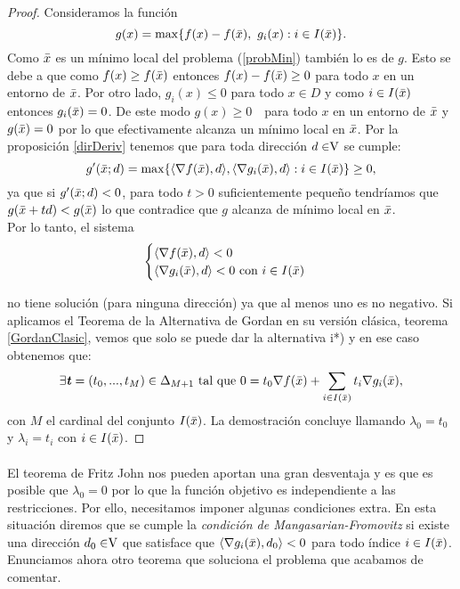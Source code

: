 		\begin{proof}
			Consideramos la función 
			\[
			g(x) = \max \{ f(x) - f(\bar{x}),\text{ } g_i(x) : i \in I(\bar{x})\}.
			\]
			Como $ \bar{x} $ es un mínimo local del problema (\ref{probMin}) también lo es de $ g $. Esto se debe a que como $ f(x) \geq f(\bar{x}) $ entonces $ f(x) - f(\bar{x}) \geq 0$ para todo $ x $ en un entorno de $ \bar{x} $. Por otro lado, $ g_i(x) \leq 0 $ para todo $ x \in D $ y como $ i \in I(\bar{x}) $ entonces $ g_i(\bar{x})=0 $. De este modo $ g(x) \geq 0 \text{ } $ para todo $ x $ en un entorno de $ \bar{x} $ y $ g(\bar{x}) = 0 $ por lo que efectivamente alcanza un mínimo local en $ \bar{x} $. Por la proposición \ref{dirDeriv} tenemos que para toda dirección $ d \in \vecSpace $ se cumple:
			\[
			g'(\bar{x};d) = \max \{ \langle \nabla f(\bar{x}), d\rangle , \langle \nabla g_i(\bar{x}),d \rangle : i \in I(\bar{x})\} \geq 0,
			\]
			ya que si $ g'(\bar{x};d) < 0 $, para todo $ t > 0 $ suficientemente pequeño tendríamos que $ g(\bar{x} + td) < g(\bar{x}) $ lo que contradice que $ g $ alcanza de mínimo local en $ \bar{x} $. \\
			
			Por lo tanto, el sistema 
			\begin{equation*}
			\begin{cases}
			\langle \nabla f(\bar{x}), d\rangle  < 0 \\
			\langle \nabla g_i(\bar{x}),d \rangle < 0\text{ con } i \in I(\bar{x})
			\end{cases}
			\end{equation*}
			
			no tiene solución (para ninguna dirección) ya que al menos uno es no negativo. Si aplicamos el Teorema de la Alternativa de Gordan en su versión clásica, teorema \ref{GordanClasic}, vemos que solo se puede dar la alternativa i*) y en ese caso obtenemos que:
			\[
			 \exists \textbf{\emph{t}} = (t_0, ..., t_{M})\in \Delta_{M+1}  \text{ tal que }0 = t_0 \nabla f(\bar{x}) + \sum_{i \in I(\bar{x})}  t_i \nabla g_i (\bar{x}),
			 \]
			con $ M $ el cardinal del conjunto $ I(\bar{x}) $. La demostración concluye llamando $ \lambda_0 = t_0 $ y $ \lambda_i = t_i $ con $ i \in I(\bar{x}) $.
		\end{proof}
	
		\paragraph{}El teorema de Fritz John nos pueden aportan una gran desventaja y es que es posible que $ \lambda_0 = 0 $ por lo que la función objetivo es independiente a las restricciones. Por ello, necesitamos imponer algunas condiciones extra. En esta situación diremos que se cumple la \textit{condición de Mangasarian-Fromovitz} si existe una dirección $ d_0 \in \vecSpace $ que satisface que $ \langle \nabla g_i(\bar{x}),d_0 \rangle < 0 $ para todo índice $ i \in I(\bar{x})$. Enunciamos ahora otro teorema que soluciona el problema que acabamos de comentar.
		
